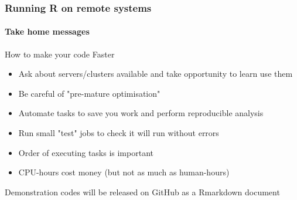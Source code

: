\documentclass{beamer}
\begin{document}
            \begin{frame}
    \frametitle{ Running R on remote systems}
    \framesubtitle{Take home messages}
  
  How to make your code Faster
      
     \begin{itemize}
    \item  Ask about servers/clusters available and take opportunity to learn use them
    \bigskip
    
   \item Be careful of "pre-mature optimisation"
    \bigskip
    
   \item Automate tasks to save you work and perform reproducible analysis
    \bigskip
    
   \item Run small "test" jobs to check it will run without errors
    \bigskip
    
   \item Order of executing tasks is important
    \bigskip
    
   \item CPU-hours cost money (but not as much as human-hours)
   
     
     \end{itemize}
     
     Demonstration  codes will be released on GitHub as a Rmarkdown document
      \end{frame}
  \iffalse
\end{document}
